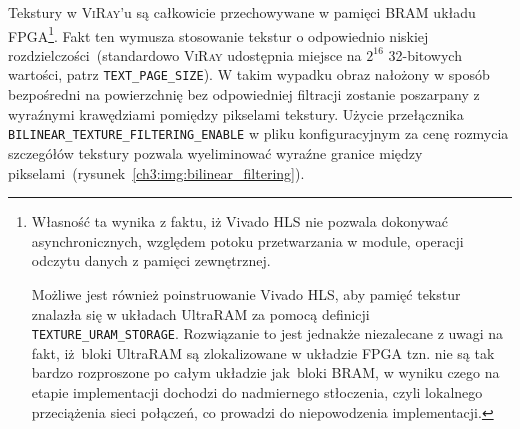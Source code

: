 \begin{enumerate}

Tekstury w \textsc{ViRay}'u są całkowicie przechowywane w pamięci BRAM układu FPGA\footnote{Własność ta wynika z faktu, iż Vivado HLS nie pozwala dokonywać asynchronicznych, względem potoku przetwarzania w module, operacji odczytu danych z pamięci zewnętrznej.

Możliwe jest również poinstruowanie Vivado HLS, aby pamięć tekstur znalazła się w układach UltraRAM za pomocą definicji \texttt{TEXTURE\_URAM\_STORAGE}. Rozwiązanie to jest jednakże niezalecane z uwagi na fakt, iż~bloki UltraRAM są zlokalizowane w układzie FPGA tzn. nie są tak bardzo rozproszone po całym układzie jak~bloki BRAM, w wyniku czego na etapie implementacji dochodzi do nadmiernego stłoczenia, czyli lokalnego przeciążenia sieci połączeń, co prowadzi do niepowodzenia implementacji.

}. Fakt ten wymusza stosowanie tekstur o odpowiednio niskiej rozdzielczości~(standardowo \textsc{ViRay} udostępnia miejsce na $2^{16}$ 32-bitowych wartości, patrz \texttt{TEXT\_PAGE\_SIZE}). W takim wypadku obraz nałożony w sposób bezpośredni na powierzchnię bez odpowiedniej filtracji zostanie poszarpany z wyraźnymi krawędziami pomiędzy pikselami tekstury. Użycie przełącznika \texttt{BILINEAR\_TEXTURE\_FILTERING\_ENABLE} w pliku konfiguracyjnym za cenę rozmycia szczegółów tekstury pozwala wyeliminować wyraźne granice między pikselami~(rysunek~\ref{ch3:img:bilinear_filtering}). 



\end{enumerate}
